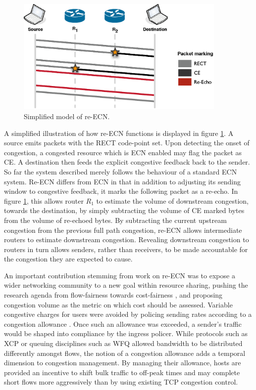 \begin{figure}
    \centering
    \includegraphics[width=4.0in]{figures/resourcepooling/reecn}
    \caption{Simplified model of re-\acs{ECN}.}
    \label{fig:reecn}
\end{figure}

A simplified illustration of how re-\ac{ECN} functions is displayed in figure \ref{fig:reecn}.
A source emits packets with the \ac{RECT} code-point set.
Upon detecting the onset of congestion, a congested resource which is \ac{ECN} enabled may flag the packet as \ac{CE}.
A destination then feeds the explicit congestive feedback back to the sender.
So far the system described merely follows the behaviour of a standard \ac{ECN} system.
Re-\ac{ECN} differs from \ac{ECN} in that in addition to adjusting its sending window to congestive feedback, it marks the following packet as a re-echo.
In figure \ref{fig:reecn}, this allows router $R_1$ to estimate the volume of downstream congestion, towards the destination, by simply subtracting the volume of \ac{CE} marked bytes from the volume of re-echoed bytes.
By subtracting the current upstream congestion from the previous full path congestion, re-{ECN} allows intermediate routers to estimate downstream congestion.
Revealing downstream congestion to routers in turn allows senders, rather than receivers, to be made accountable for the congestion they are expected to cause.

An important contribution stemming from work on re-\ac{ECN} was to expose a wider networking community to a new goal within resource sharing, pushing the research agenda from flow-fairness towards cost-fairness \cite{Briscoe:2007p261}, and proposing congestion volume as the metric on which cost should be assessed.
Variable congestive charges for users were avoided by policing sending rates according to a congestion allowance \cite{Jacquet:2008p341}.
Once such an allowance was exceeded, a sender's traffic would be shaped into compliance by the ingress policer.
While protocols such as \ac{XCP} or queuing disciplines such as \ac{WFQ} allowed bandwidth to be distributed differently amongst flows, the notion of a congestion allowance adds a temporal dimension to congestion management.
By managing their allowance, hosts are provided an incentive to shift bulk traffic to off-peak times and may complete short flows more aggressively than by using existing \ac{TCP} congestion control.

